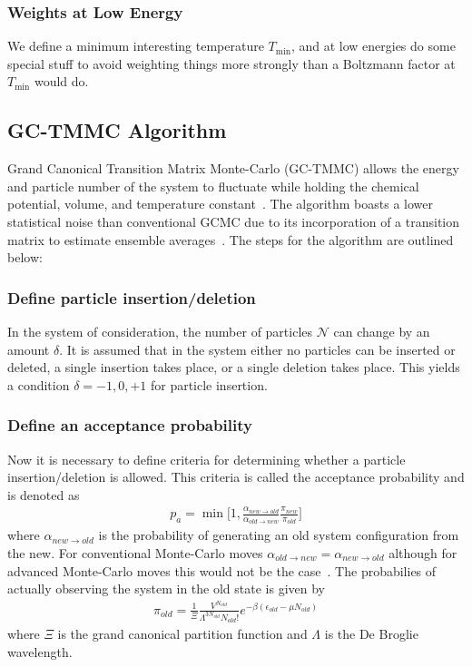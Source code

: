 \documentclass[letterpaper,twocolumn,amsmath,amssymb,pre,aps,10pt]{revtex4-1}
\begin{document}
\subsubsection{Weights at Low Energy}
We define a minimum interesting temperature $T_{\min}$, and at low
energies do some special stuff to avoid weighting things more
strongly than a Boltzmann factor at $T_{\min}$ would do.

\subsection{GC-TMMC Algorithm}
Grand Canonical Transition Matrix Monte-Carlo (GC-TMMC) allows the energy and 
particle number of the system to fluctuate while holding the chemical potential,
volume, and temperature constant~\cite{chen2001aggregation, chen2002simulating, 
errington2003direct, fenwick2006accurate, fenwick2008direct, errington2005direct}.  
The algorithm boasts a lower statistical noise than conventional GCMC due to its 
incorporation of a transition matrix to estimate ensemble averages~\cite{siderius2013use, 
paluch2008comparing, grzelak2008computation}.  The steps for the algorithm are 
outlined below:

\subsubsection{Define particle insertion/deletion}
In the system of consideration, the number of particles $\mathcal{N}$ can change
by an amount $\delta$.  It is assumed that in the system either no particles can be 
inserted or deleted, a single insertion takes place, or a single deletion takes place.
This yields a condition $\delta={-1,0,+1}$ for particle insertion.

\subsubsection{Define an acceptance probability}
Now it is necessary to define criteria for determining whether a particle insertion/deletion
is allowed.  This criteria is called the acceptance probability and is denoted as
\begin{align}
  p_{a} = \min\bigg[1,\frac{\alpha_{new\rightarrow old}}
  {\alpha_{old \rightarrow new}}\frac{\pi_{new}}{\pi_{old}}\bigg]
\end{align}
where $\alpha_{new\rightarrow old}$ is the probability of generating an old system 
configuration from the new.  For conventional Monte-Carlo moves $\alpha_{old \rightarrow new}
=\alpha_{new\rightarrow old}$ although for advanced Monte-Carlo moves this would not 
be the case~\cite{siepmann1990method}.  The probabilies of actually observing the 
system in the old state is given by
\begin{align}
  \pi_{old} = \frac{1}{\Xi}\frac{V^{N_{old}}}{\Lambda^{3N_{old}}N_{old}!}
  e^{-\beta(\epsilon_{old}-\mu N_{old})}
\end{align}  
where $\Xi$ is the grand canonical partition function and $\Lambda$ is the De Broglie
wavelength.
\end{document}
